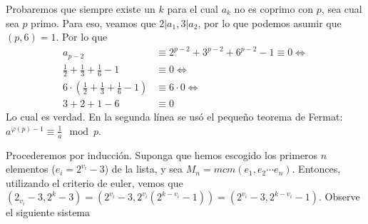 \begin{sol}
	Probaremos que siempre existe un $k$ para el cual $a_{k}$ no es coprimo con $p$, sea cual sea $p$ primo. Para eso, veamos que $2|a_{1}, 3|a_{2}$, por lo que podemos asumir que $(p, 6) = 1$. Por lo que 
	\begin{align}
	a_{p-2} &\equiv 2^{p-2} + 3^{p-2} + 6^{p-2} -1 \equiv 0 \iff \\
	\frac{1}{2}+\frac{1}{3}+\frac{1}{6}-1 &\equiv 0 \iff \\
	6 \cdot ( \frac{1}{2}+\frac{1}{3}+\frac{1}{6}-1) &\equiv 6 \cdot 0 \iff \\
	3 + 2 + 1 - 6 &\equiv 0
	\end{align}
	Lo cual es verdad. En la segunda l\'inea se us\'o el pequeño teorema de Fermat: $a^{\varphi(p)-1} \equiv \frac{1}{a} \mod p$.
\end{sol}

\begin{sol}
	Procederemos por inducci\'on. Suponga que hemos escogido los primeros $n$ elementos ($e_{i} = 2 ^{v_{i}} - 3$) de la lista, y sea $M_{n} = mcm(e_{1}, e_{2} \cdots e_{n})$. Entonces, utilizando el criterio de euler, vemos que $(2_{v_{i}}-3, 2^{k}-3) = (2^{v_{i}}-3, 2^{v_{i}}(2^{k-v_{i}}-1)) = (2^{v_{i}}-3, 2^{k-v_{i}}-1)$. Observe el siguiente sistema
\end{sol}


